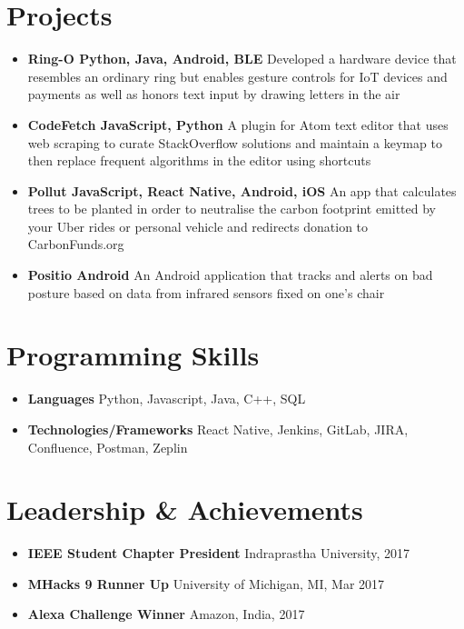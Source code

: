 \documentclass[letterpaper,11pt]{article}
\newcommand{\resumeItem}[2]{
  \item\small{
    \textbf{#1}{#2 \vspace{-2pt}}
  }
}
\newcommand{\resumeSubItem}[2]{\resumeItem{#1}{#2}\vspace{-4pt}}
\newcommand{\resumeSubHeadingListStart}{\begin{itemize}[leftmargin=*]}
\newcommand{\resumeSubHeadingListEnd}{\end{itemize}}
\begin{document}
\section{Projects}
  \resumeSubHeadingListStart
    \resumeSubItem{Ring-O \text{\textbar} Python, Java, Android, BLE }
      {Developed a hardware device that resembles an ordinary ring but enables gesture controls for IoT devices and payments as well as honors text input by drawing letters in the air}
    \resumeSubItem{CodeFetch \text{\textbar} JavaScript, Python }
      {A plugin for Atom text editor that uses web scraping to curate StackOverflow solutions and maintain a keymap to then replace frequent algorithms in the editor using shortcuts}
    \resumeSubItem{Pollut \text{\textbar} JavaScript, React Native, Android, iOS }
      {An app that calculates trees to be planted in order to neutralise the carbon footprint emitted by your Uber rides or personal vehicle and redirects donation to CarbonFunds.org}
    \resumeSubItem{Positio \text{\textbar} Android }
      {An Android application that tracks and alerts on bad posture based on data from infrared sensors fixed on one's chair}
  \resumeSubHeadingListEnd


\section{Programming Skills}
  \resumeSubHeadingListStart
    \resumeSubItem{Languages }
      {Python, Javascript, Java, C++, SQL}
    \resumeSubItem{Technologies/Frameworks }
      {React Native, Jenkins, GitLab, JIRA, Confluence, Postman, Zeplin}
  \resumeSubHeadingListEnd


\section{Leadership \& Achievements}
  \resumeSubHeadingListStart
    \resumeSubItem{IEEE Student Chapter \text{\textbar} President }
      {Indraprastha University, 2017}
    \resumeSubItem{MHacks 9 \text{\textbar} Runner Up }
      {University of Michigan, MI, Mar 2017}
    \resumeSubItem{Alexa Challenge \text{\textbar} Winner }
      {Amazon, India, 2017}
  \resumeSubHeadingListEnd


\end{document}

